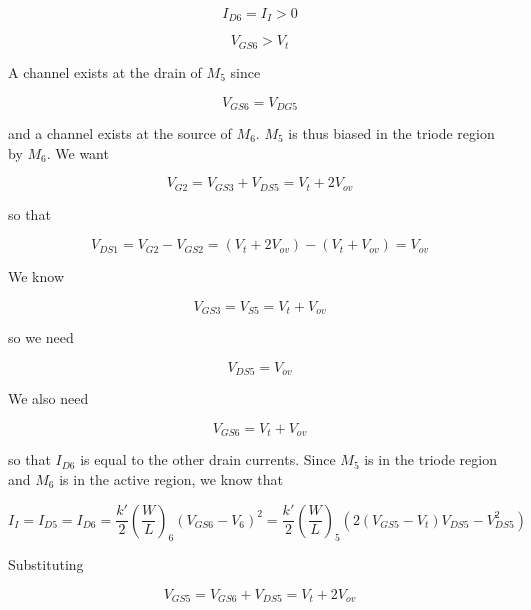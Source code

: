 \begin{equation}
I_{D6} = I_{I} > 0
\end{equation}

\begin{equation}
V_{GS6} > V_{t}
\end{equation}

A channel exists at the drain of $M_{5}$ since

\begin{equation}
V_{GS6} = V_{DG5}
\end{equation}

and a channel exists at the source of $M_{6}$. $M_{5}$ is thus biased in the triode region by $M_{6}$. We want

\begin{equation}
V_{G2} = V_{GS3} + V_{DS5} = V_{t} + 2V_{ov}
\end{equation}

so that

\begin{equation}
V_{DS1} = V_{G2} - V_{GS2} = (V_{t} + 2V_{ov}) - (V_{t} + V_{ov}) = V_{ov}
\end{equation}

We know

\begin{equation}
V_{GS3} = V_{S5} = V_{t} + V_{ov}
\end{equation}

so we need

\begin{equation}
V_{DS5} = V_{ov}
\end{equation}

We also need

\begin{equation}
V_{GS6} = V_{t} + V_{ov}
\end{equation}

so that $I_{D6}$ is equal to the other drain currents. Since $M_{5}$ is in the triode region and $M_{6}$ is in the active region, we know that

\begin{equation}
I_{I} = I_{D5} = I_{D6} = \frac{k'}{2}\left(\frac{W}{L}\right)_{6}(V_{GS6}-V_{6})^{2} = \frac{k'}{2}\left(\frac{W}{L}\right)_{5}(2(V_{GS5}-V_{t})V_{DS5} - V_{DS5}^{2})
\label{eq:Soochcurrentmirror_Ii}
\end{equation}

Substituting

\begin{equation}
V_{GS5} = V_{GS6} + V_{DS5} = V_{t} + 2V_{ov}
\end{equation}

